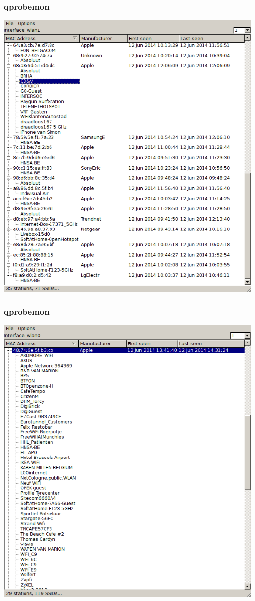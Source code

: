 \documentclass{beamer}
\begin{document}
  \begin{frame}
    \frametitle{qprobemon}
    \includegraphics[keepaspectratio,width=\textwidth]{qprobemon-scary.png}
  \end{frame}

  \begin{frame}
    \frametitle{qprobemon}
    \includegraphics[keepaspectratio,width=\textwidth]{qprobemon-scary2.png}
  \end{frame}
\end{document}
